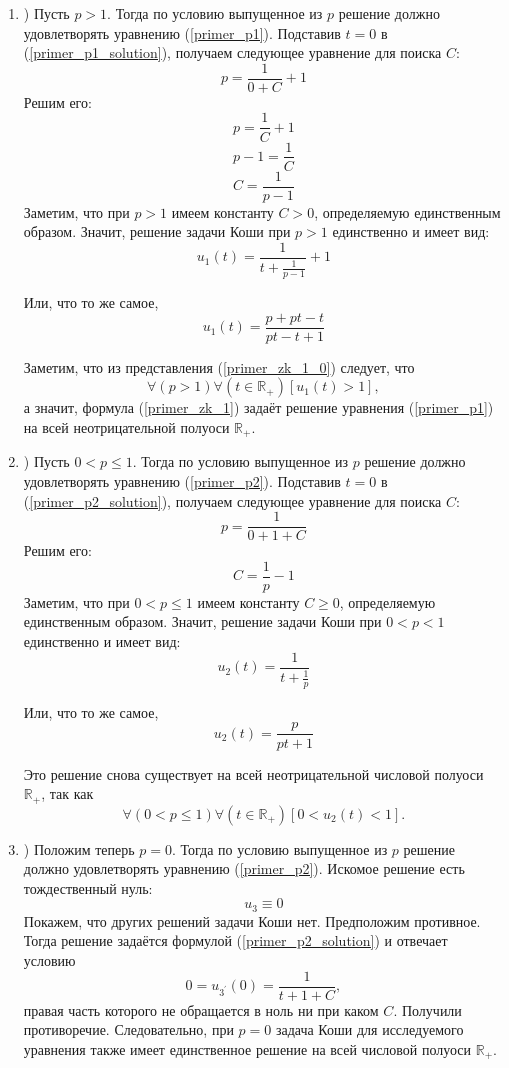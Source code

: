 \begin{enumerate}

\item)
Пусть $p>1$.
Тогда по условию выпущенное из $p$ решение должно удовлетворять уравнению (\ref{primer_p1}).
Подставив $t=0$ в (\ref{primer_p1_solution}), получаем следующее уравнение для поиска $C$:
$$
	p=\frac{1}{0+C}+1
$$
Решим его:
$$
	p=\frac{1}{C}+1
$$
$$
	p-1=\frac{1}{C}
$$
$$
	C=\frac{1}{p-1}
$$
Заметим, что при $p>1$ имеем константу $C>0$, определяемую единственным образом.
Значит, решение задачи Коши при $p>1$ единственно и имеет вид:
\begin{equation}\label{primer_zk_1_0}
	u_1(t)=\frac{1}{t+\frac{1}{p-1}}+1
\end{equation}

Или, что то же самое,
\begin{equation}\label{primer_zk_1}
	u_1(t)=\frac{p+pt-t}{pt-t+1}
\end{equation}

Заметим, что из представления (\ref{primer_zk_1_0}) следует, что
$$
	\forall(p>1)\forall\left(t \in \mathbb{R}_+\right)\left[u_1(t) > 1\right],
$$
а значит, формула (\ref{primer_zk_1}) задаёт решение уравнения (\ref{primer_p1}) на всей неотрицательной полуоси $\mathbb{R}_+$.

\item)
Пусть $0<p \leq 1$.
Тогда по условию выпущенное из $p$ решение должно удовлетворять уравнению (\ref{primer_p2}).
Подставив $t=0$ в (\ref{primer_p2_solution}), получаем следующее уравнение для поиска $C$:
$$
	p=\frac{1}{0+1+C}
$$
Решим его:
$$
	C=\frac{1}{p}-1
$$
Заметим, что при $0<p \leq 1$ имеем константу $C \geq 0$, определяемую единственным образом.
Значит, решение задачи Коши при $0<p<1$ единственно и имеет вид:
\begin{equation}\label{primer_zk_2_0}
	u_2(t)=\frac{1}{t+\frac{1}{p}}
\end{equation}

Или, что то же самое,
\begin{equation}\label{primer_zk_2}
	u_2(t)=\frac{p}{pt+1}
\end{equation}

Это решение снова существует на всей неотрицательной числовой полуоси $\mathbb{R}_+$, так как
$$
	\forall(0<p \leq 1)\forall\left(t \in \mathbb{R}_+\right)\left[0 < u_2(t) < 1\right].
$$

\item)
Положим теперь $p=0$.
Тогда по условию выпущенное из $p$ решение должно удовлетворять уравнению (\ref{primer_p2}).
Искомое решение есть тождественный нуль:
\begin{equation}\label{primer_zk_3}
	u_3 \equiv 0
\end{equation}
Покажем, что других решений задачи Коши нет.
Предположим противное.
Тогда решение задаётся формулой (\ref{primer_p2_solution}) и отвечает условию
$$
	0=u_{3^{'}}(0)=\frac{1}{t+1+C},
$$
правая часть которого не обращается в ноль ни при каком $C$.
Получили противоречие.
Следовательно, при $p=0$ задача Коши для исследуемого уравнения также имеет единственное решение на всей числовой полуоси $\mathbb{R}_+$.


\end{enumerate}
